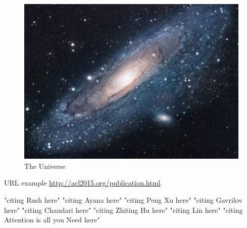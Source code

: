 \documentclass[11pt]{article}
\begin{document}
\begin{figure}[h!]
\centering
\includegraphics[scale=1.7]{universe}
\caption{The Universe}
\label{fig:universe}
\end{figure}

URL example
\url{http://acl2015.org/publication.html}.

"citing Rush here" \citep{rush2015neural}
"citing Ayana here" \cite{Ayana2017}
"citing Peng Xu here" \cite{DBLP:journals/corr/abs-1902-07110}
"citing Gavrilov here" \cite{DBLP:journals/corr/abs-1901-07786}
"citing Chaudari here" \cite{DBLP:journals/corr/abs-1802-09426}
"citing Zhiting Hu here" \cite{DBLP:journals/corr/HuYLSX17}
"citing Lin here" \cite{lin-2004-rouge}
"citing Attention is all you Need here" \cite{DBLP:journals/corr/VaswaniSPUJGKP17}



\end{document}
